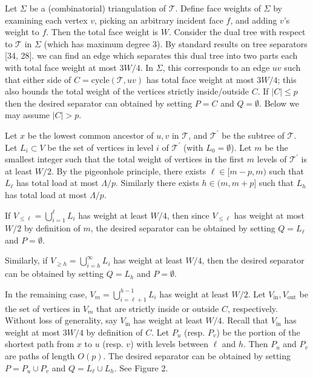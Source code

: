 \documentclass[10pt,a4paper]{article}
\begin{document}
\par
\par
Let $\Sigma$ be a (combinatorial) triangulation of $\mathcal{T}$. Define face weights of $\Sigma$ by examining each vertex $v$, picking an arbitrary incident face $f$, and adding $v$’s weight to $f$. Then the total face weight is $W$. Consider the dual tree with respect to $\mathcal{T}$ in $\Sigma$ (which has maximum degree 3). By standard results on tree separators [34, 28]. we can find an edge which separates this dual tree into two parts each with total face weight at most $3W/4$. In $\Sigma$, this corresponds to an edge $uv$ such that either side of $C=\mathrm{cycle}(\mathcal{T},uv)$ has total face weight at most $3W/4$; this also bounds the total weight of the vertices strictly inside/outside $C$. If ${\left|C\right|}\leq p$ then the desired separator can obtained by setting $P=C$ and $Q=\emptyset$. Below we may assume ${\left|C\right|}>p$.
\par
\par
Let $x$ be the lowest common ancestor of $u,v$ in $\mathcal{T}$, and $\mathcal{T}^{\prime}$ be the subtree of $\mathcal{T}$. Let $L_{i}\subset V$ be the set of vertices in level $i$ of $\mathcal{T}^{\prime}$ (with $L_{0}=\emptyset$). Let $m$ be the smallest integer such that the total weight of vertices in the first $m$ levels of $\mathcal{T}^{\prime}$ is at least $W/2$. By the pigeonhole principle, there exists $\ell\in[m-p,m)$ such that $L_{\ell}$ has total load at most $\Lambda/p$. Similarly there exists $h\in(m,m+p]$ such that $L_{h}$ has total load at most $\Lambda/p$.
\par
\par
If $V_{\leq\ell}=\bigcup_{i=1}^{\ell}L_{i}$ has weight at least $W/4$, then since $V_{\leq\ell}$ has weight at most $W/2$ by definition of $m$, the desired separator can be obtained by setting $Q=L_{\ell}$ and $P=\emptyset$.
\par
\par
Similarly, if $V_{\geq h}=\bigcup_{i=h}^{\infty}L_{i}$ has weight at least $W/4$, then the desired separator can be obtained by setting $Q=L_{h}$ and $P=\emptyset$.
\par
\par
In the remaining case, $V_{m}=\bigcup_{i=\ell+1}^{h-1}L_{i}$ has weight at least $W/2$. Let $V_{\mathrm{in}},V_{\mathrm{out}}$ be the set of vertices in $V_{m}$ that are strictly inside or outside $C$, respectively. Without loss of generality, say $V_{\mathrm{in}}$ has weight at least $W/4$. Recall that $V_{\mathrm{in}}$ has weight at most $3W/4$ by definition of $C$. Let $P_{u}$ (resp. $P_{v}$) be the portion of the shortest path from $x$ to $u$ (resp. $v$) with levels between $\ell$ and $h$. Then $P_{u}$ and $P_{v}$ are paths of length $O(p)$. The desired separator can be obtained by setting $P=P_{u}\cup P_{v}$ and $Q=L_{\ell}\cup L_{h}$. See Figure 2.
\end{document}
